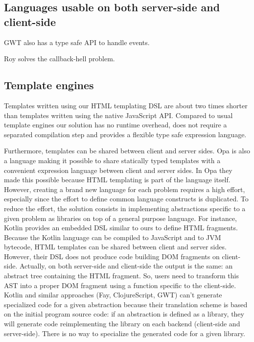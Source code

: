 \documentclass[american,english,runningheads]{llncs}
\begin{document}
\subsection{Languages usable on both server-side and client-side}

GWT also has a type safe API to handle events.

Roy solves the callback-hell problem.

\subsection{Template engines}

Templates written using our HTML templating DSL are about two times shorter than templates written using the native JavaScript API. Compared to usual template engines our solution has no runtime overhead, does not require a separated compilation step and provides a flexible type safe expression language.

Furthermore, templates can be shared between client and server sides. Opa is also a language making it possible to share statically typed templates with a convenient expression language between client and server sides. In Opa they made this possible because HTML templating is part of the language itself. However, creating a brand new language for each problem requires a high effort, especially since the effort to define common language constructs is duplicated. To reduce the effort, the solution consists in implementing abstractions specific to a given problem as libraries on top of a general purpose language. For instance, Kotlin provides an embedded DSL similar to ours to define HTML fragments. Because the Kotlin language can be compiled to JavaScript and to JVM bytecode, HTML templates can be shared between client and server sides. However, their DSL does not produce code building DOM fragments on client-side. Actually, on both server-side and client-side the output is the same: an abstract tree containing the HTML fragment. So, users need to transform this AST into a proper DOM fragment using a function specific to the client-side. Kotlin and similar approaches (Fay, ClojureScript, GWT) can’t generate specialized code for a given abstraction because their translation scheme is based on the initial program source code: if an abstraction is defined as a library, they will generate code reimplementing the library on each backend (client-side and server-side). There is no way to specialize the generated code for a given library.
\end{document}
